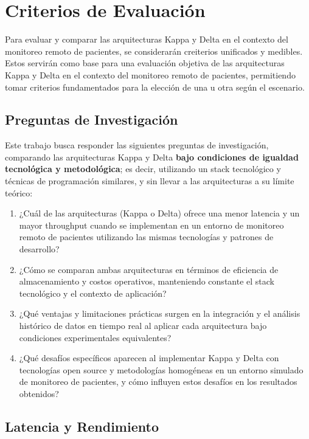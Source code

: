 \section{Criterios de Evaluación}

Para evaluar y comparar las arquitecturas Kappa y Delta en el contexto del monitoreo remoto de pacientes, se considerarán creiterios unificados y medibles.
Estos servirán como base para una evaluación objetiva de las arquitecturas Kappa y Delta en el contexto del monitoreo remoto de pacientes, permitiendo tomar criterios 
fundamentados para la elección de una u otra según el escenario.

\subsection{Preguntas de Investigación}

Este trabajo busca responder las siguientes preguntas de investigación, comparando las arquitecturas Kappa y Delta \textbf{bajo condiciones de igualdad tecnológica y metodológica}; es decir, utilizando un stack tecnológico y técnicas de programación similares, y sin llevar a las arquitecturas a su límite teórico:

\begin{enumerate}
    \item ¿Cuál de las arquitecturas (Kappa o Delta) ofrece una menor latencia y un mayor throughput cuando se implementan en un entorno de monitoreo remoto de pacientes utilizando las mismas tecnologías y patrones de desarrollo?
    \item ¿Cómo se comparan ambas arquitecturas en términos de eficiencia de almacenamiento y costos operativos, manteniendo constante el stack tecnológico y el contexto de aplicación?
    \item ¿Qué ventajas y limitaciones prácticas surgen en la integración y el análisis histórico de datos en tiempo real al aplicar cada arquitectura bajo condiciones experimentales equivalentes?
    \item ¿Qué desafíos específicos aparecen al implementar Kappa y Delta con tecnologías open source y metodologías homogéneas en un entorno simulado de monitoreo de pacientes, y cómo influyen estos desafíos en los resultados obtenidos?
\end{enumerate}

\newpage

\subsection{Latencia y Rendimiento}

